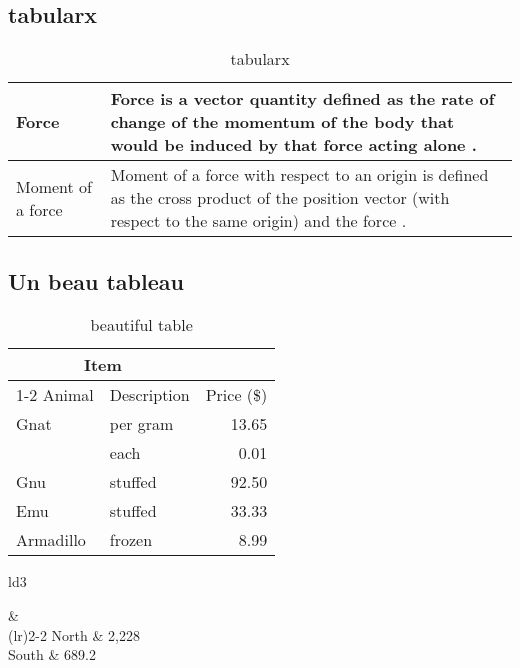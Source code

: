 \subsection{tabularx}


\begin{table}[H]
	\centering
	\caption{tabularx}	
	\label{tab:tabularx}
	\begin{tabularx}{\textwidth}{lX}
\hline 
Force    & Force  is a vector  quantity  defined  as the  rate of  change  of
the  momentum  of the  body  that  would  be  induced  by that force  acting  alone . \\ 
\hline 
Moment  of a force   & Moment  of a force  with  respect  to an  origin  is
defined  as the  cross  product  of the  position  vector (with  respect  to
the  same  origin) and  the force . \\
\hline 
	\end{tabularx}
\end{table}



\subsection{Un beau tableau}


\begin{table}[H]
	\centering
	\caption{beautiful table}	
	\label{tab:beautiful}
	\begin{tabular}{llr}  
		\toprule
		\multicolumn{2}{c}{Item} \\
		\cmidrule(r){1-2}
		Animal    & Description & Price (\$) \\
		\midrule
		Gnat      & per gram    & 13.65      \\
		          &    each     & 0.01       \\
		Gnu       & stuffed     & 92.50      \\
		Emu       & stuffed     & 33.33      \\
		Armadillo & frozen      & 8.99       \\
		\bottomrule
	\end{tabular}
\end{table}


\begin{table}
	\centering
	\caption{table using dcolumn}
	\begin{tabular}{ld{3}}

		\toprule
		        &   \\
		\cmidrule(lr){2-2} 
		\midrule  
		   North &      2,228  \\    
		   South &        689.2 \\
		\bottomrule

	\end{tabular}     
\end{table}

